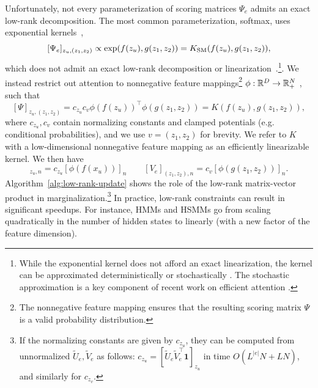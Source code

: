 \documentclass{article}
\begin{document}
Unfortunately, not every parameterization of scoring matrices $\Psi_e$
admits an exact low-rank decomposition.
The most common parameterization, softmax, uses
exponential kernels~\citep{tsai2019kernelattn}, $$[\Psi_e]_{z_u,(z_1,z_2)} \propto 
    \exp(f(z_u), g(z_1,z_2)) = K_{\mathrm{SM}}(f(z_u), g(z_1, z_2)),$$ 
which does not admit an exact low-rank decomposition or linearization~\citep{steinwart2006explicit}.\footnote{
While the exponential kernel does not afford an exact linearization, the kernel can be approximated deterministically \citep{cotter2011approx} or stochastically \citep{rahimi2007rff}.
The stochastic approximation is a key component of recent work on efficient attention \citep{choromanski2020performer,peng2021rfa}.}.
We instead restrict out attention to nonnegative feature mappings\footnote{The nonnegative feature mapping ensures that the resulting scoring matrix $\Psi$ is a valid probability distribution.} $\phi:\mathbb{R}^D\to\mathbb{R}^N_+$ \citep{choromanski2020performer}, such that
\[[\Psi]_{z_u, (z_1, z_2)} = c_{z_u} c_v \phi(f(z_u))^\top\phi(g(z_{1}, z_{2})) = K(f(z_u), g(z_1, z_2)),  \]
where $c_{z_u},c_v$ contain normalizing constants and clamped potentials (e.g. conditional probabilities), and we use $v = (z_1,z_2)$ for brevity.
We refer to $K$ with a low-dimensional nonnegative feature mapping
as an efficiently linearizable kernel.
We then have
\begin{equation}
    [U_e]_{z_u,n} = c_{z_u}[\phi(f(x_u))]_n 
    \qquad
    [V_e]_{(z_1,z_2),n} = c_v [\phi(g(z_1,z_2))]_n.
\end{equation}
Algorithm~\ref{alg:low-rank-update} shows the role of the low-rank
matrix-vector product in marginalization.\footnote{
If the normalizing constants are given by $c_{z_u}$,
they can be computed from unnormalized $\tilde{U}_e,\tilde{V}_e$ as follows: $c_{z_u} = [\tilde{U}_e\tilde{V}_e^\top\mathbf{1}]_{z_u}$ in time $O(L^{|e|}N + LN)$, and similarly for $c_{z_v}$.
}
In practice, low-rank constraints can result in significant speedups. For instance, HMMs and HSMMs go from scaling quadratically
in the number of hidden states to linearly (with a new factor of the
feature dimension).
\end{document}
